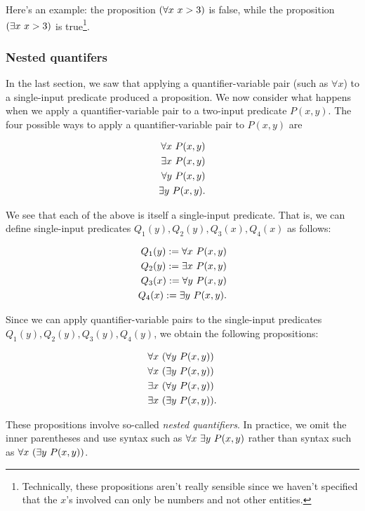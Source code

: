 Here's an example: the proposition $(\forall x \text{ } x > 3)$ is false, while the proposition $(\exists x \text{ } x > 3)$ is true\footnote{Technically, these propositions aren't really sensible since we haven't specified that the $x$'s involved can only be numbers and not other entities.}.

\subsubsection{Nested quantifers}

In the last section, we saw that applying a quantifier-variable pair (such as $\forall x$) to a single-input predicate produced a proposition. We now consider what happens when we apply a quantifier-variable pair to a two-input predicate $P(x, y)$. The four possible ways to apply a quantifier-variable pair to $P(x, y)$ are

\begin{align*}
    \forall x \text{ } P(x, y) \\
    \exists x \text{ } P(x, y) \\
    \forall y \text{ } P(x, y) \\
    \exists y \text{ } P(x, y).
\end{align*}

We see that each of the above is itself a single-input predicate. That is, we can define single-input predicates $Q_1(y), Q_2(y), Q_3(x), Q_4(x)$ as follows:

\begin{align*}
    Q_1(y) := \forall x \text{ } P(x, y) \\
    Q_2(y) := \exists x \text{ } P(x, y) \\
    Q_3(x) := \forall y \text{ } P(x, y) \\
    Q_4(x) := \exists y \text{ } P(x, y).
\end{align*}

Since we can apply quantifier-variable pairs to the single-input predicates $Q_1(y), Q_2(y), Q_3(y), Q_4(y)$, we obtain the following propositions:

\begin{align*}
    &\forall x \text{ } (\forall y \text{ } P(x, y)) \\
    &\forall x \text{ } (\exists y \text{ } P(x, y)) \\
    &\exists x \text{ } (\forall y \text{ } P(x, y)) \\
    &\exists x \text{ } (\exists y \text{ } P(x, y)).
\end{align*}

These propositions involve so-called \textit{nested quantifiers}. In practice, we omit the inner parentheses and use syntax such as $\forall x \text{ } \exists y \text{ } P(x, y)$ rather than syntax such as $\forall x \text{ } (\exists y \text{ } P(x, y))$.

